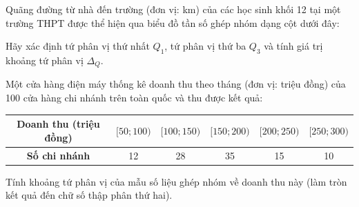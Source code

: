 \documentclass[12pt]{article}
\begin{document}
	\begin{btvang}[title={Bài 4}]
		Quãng đường từ nhà đến trường (đơn vị: km) của các học sinh khối 12 tại một trường THPT được thể hiện qua biểu đồ tần số ghép nhóm dạng cột dưới đây:
		\begin{center}
		\end{center}
		Hãy xác định tứ phân vị thứ nhất $Q_1$, tứ phân vị thứ ba $Q_3$ và tính giá trị khoảng tứ phân vị $\Delta_Q$.
	\end{btvang}
	
	\begin{btdo}[title={Bài 5}]
		Một cửa hàng điện máy thống kê doanh thu theo tháng (đơn vị: triệu đồng) của 100 cửa hàng chi nhánh trên toàn quốc và thu được kết quả:
		\begin{center}
			\renewcommand{\arraystretch}{1.3}
			\begin{tabular}{|c|c|c|c|c|c|}
				\hline
				\textbf{Doanh thu (triệu đồng)} & $[50; 100)$ & $[100; 150)$ & $[150; 200)$ & $[200; 250)$ & $[250; 300)$ \\
				\hline
				\textbf{Số chi nhánh} & 12 & 28 & 35 & 15 & 10 \\
				\hline
			\end{tabular}
		\end{center}
		Tính khoảng tứ phân vị của mẫu số liệu ghép nhóm về doanh thu này (làm tròn kết quả đến chữ số thập phân thứ hai).
	\end{btdo}
	
\end{document}

